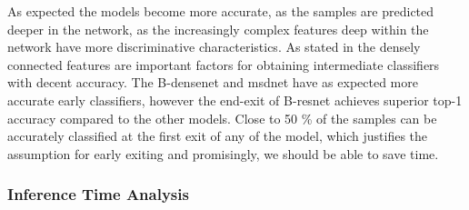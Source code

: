 As expected the models become more accurate, as the samples are predicted deeper in the network, as the increasingly complex features deep within the network have more discriminative characteristics. As stated in \cite{huang_multi-scale_2017} the densely connected features are important factors for obtaining intermediate classifiers with decent accuracy. The B-\gls{densenet} and \gls{msdnet} have as expected more accurate early classifiers, however the end-exit of B-\gls{resnet} achieves superior top-1 accuracy compared to the other models. Close to 50 \% of the samples can be accurately classified at the first exit of any of the model, which justifies the assumption for early exiting and promisingly, we should be able to save time. 

\subsubsection{Inference Time Analysis}

